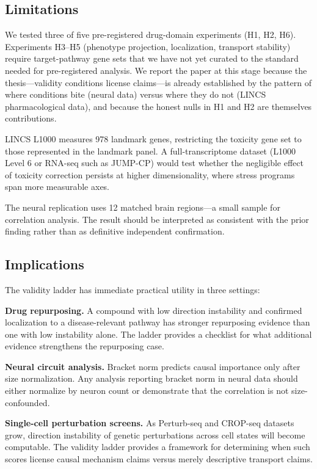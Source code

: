 \documentclass{article}
\begin{document}
\subsection{Limitations}

We tested three of five pre-registered drug-domain experiments (H1, H2, H6).
Experiments H3--H5 (phenotype projection, localization, transport stability)
require target-pathway gene sets that we have not yet curated to the standard
needed for pre-registered analysis. We report the paper at this stage because
the thesis---validity conditions license claims---is already established by the
pattern of where conditions bite (neural data) versus where they do not
(LINCS pharmacological data), and because the honest nulls in H1 and H2 are
themselves contributions.

LINCS L1000 measures 978 landmark genes, restricting the toxicity gene set to
those represented in the landmark panel. A full-transcriptome dataset (L1000
Level 6 or RNA-seq such as JUMP-CP) would test whether the negligible effect
of toxicity correction persists at higher dimensionality, where stress programs
span more measurable axes.

The neural replication uses 12 matched brain regions---a small sample for
correlation analysis. The result should be interpreted as consistent with the
prior finding rather than as definitive independent confirmation.

\subsection{Implications}

The validity ladder has immediate practical utility in three settings:

\textbf{Drug repurposing.} A compound with low direction instability and
confirmed localization to a disease-relevant pathway has stronger repurposing
evidence than one with low instability alone. The ladder provides a checklist
for what additional evidence strengthens the repurposing case.

\textbf{Neural circuit analysis.} Bracket norm predicts causal importance only
after size normalization. Any analysis reporting bracket norm in neural data
should either normalize by neuron count or demonstrate that the correlation is
not size-confounded.

\textbf{Single-cell perturbation screens.} As Perturb-seq and CROP-seq datasets
grow, direction instability of genetic perturbations across cell states will
become computable. The validity ladder provides a framework for determining
when such scores license causal mechanism claims versus merely descriptive
transport claims.
\end{document}
